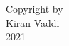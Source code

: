 


\begin{center}
\null
\vfill
\begin{doublespace}
Copyright by \\ 
Kiran Vaddi \\ 
2021 \\
\end{doublespace}
\end{center}
